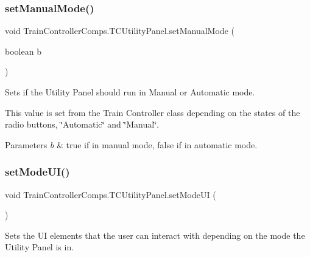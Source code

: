 \subsubsection{\texorpdfstring{set\+Manual\+Mode()}{setManualMode()}}
{\footnotesize\ttfamily void Train\+Controller\+Comps.\+T\+C\+Utility\+Panel.\+set\+Manual\+Mode (\begin{DoxyParamCaption}\item[{boolean}]{b }\end{DoxyParamCaption})}



Sets if the Utility Panel should run in Manual or Automatic mode. 

This value is set from the Train Controller class depending on the states of the radio buttons, \char`\"{}\+Automatic\char`\"{} and \char`\"{}\+Manual\char`\"{}.


\begin{DoxyParams}{Parameters}
{\em b} & true if in manual mode, false if in automatic mode. \\
\hline
\end{DoxyParams}
\mbox{\label{classTrainControllerComps_1_1TCUtilityPanel_a404cb0d28b20be30802d78de9e83a831}} 
\subsubsection{\texorpdfstring{set\+Mode\+U\+I()}{setModeUI()}}
{\footnotesize\ttfamily void Train\+Controller\+Comps.\+T\+C\+Utility\+Panel.\+set\+Mode\+UI (\begin{DoxyParamCaption}{ }\end{DoxyParamCaption})\hspace{0.3cm}{\ttfamily [private]}}



Sets the UI elements that the user can interact with depending on the mode the Utility Panel is in. 

\mbox{\label{classTrainControllerComps_1_1TCUtilityPanel_aceae293b2d91b1f7d49518f1697b66d3}} 
